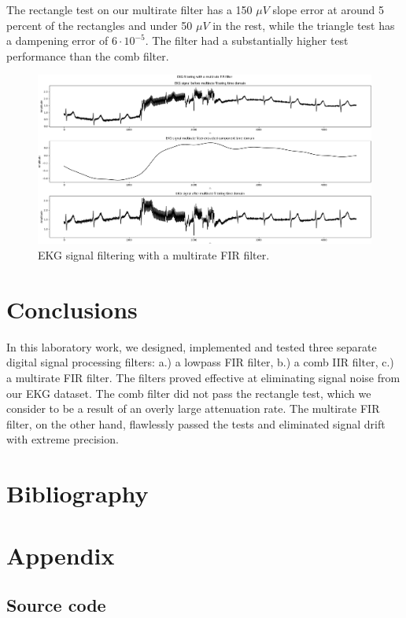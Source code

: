 \documentclass[10pt,a4paper,twocolumn]{article}
\begin{document}
The rectangle test on our multirate filter has a 150 $\mu V$ slope error at around 5 percent of the rectangles and under 50 $\mu V$ in the rest, while the triangle test has a dampening error of $6 \cdot 10^{-5}$. The filter had a substantially higher test performance than the comb filter.

\begin{figure} %
	[!h]
	\centering
	\includegraphics*[width=.95\columnwidth]{multirate_test.png} %
	\caption{EKG signal filtering with a multirate FIR filter.}
	\label{multirate_test}
	\vspace{6pt}
\end{figure}

\section*{Conclusions}
In this laboratory work, we designed, implemented and tested three separate digital signal processing filters: a.) a lowpass FIR filter, b.) a comb IIR filter, c.) a multirate FIR filter. The filters proved effective at eliminating signal noise from our EKG dataset. The comb filter did not pass the rectangle test, which we consider to be a result of an overly large attenuation rate. The multirate FIR filter, on the other hand, flawlessly passed the tests and eliminated signal drift with extreme precision.

\section*{Bibliography}

\renewcommand\refname{}
\vspace*{-24pt}
\makeatother

\section*{Appendix}

\subsection*{Source code}
\onecolumn
\end{document}
